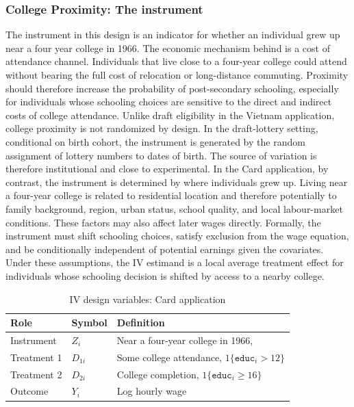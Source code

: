 \documentclass[12pt, a4paper, oneside]{article}
\theoremstyle{plain}
\theoremstyle{definition}
\begin{document}
\subsubsection{College Proximity: The instrument}
The instrument in this design is an indicator for whether an individual grew up near a four year college in 1966. The economic mechanism behind is a cost of attendance channel. Individuals that live close to a four-year college could attend without bearing the full cost of relocation or long-distance commuting. Proximity should therefore increase the probability of post-secondary schooling, especially for individuals whose schooling choices are sensitive to the direct and indirect costs of college attendance.
Unlike draft eligibility in the Vietnam application, college proximity is not randomized by design. In the draft-lottery setting, conditional on birth cohort, the instrument is generated by the random assignment of lottery numbers to dates of birth. The source of variation is therefore institutional and close to experimental. In the Card application, by contrast, the instrument is determined by where individuals grew up. Living near a four-year college is related to residential location and therefore potentially to family background, region, urban status, school quality, and local labour-market conditions. These factors may also affect later wages directly.
Formally, the instrument must shift schooling choices, satisfy exclusion from the wage equation, and be conditionally independent of potential earnings given the covariates. Under these assumptions, the IV estimand is a local average treatment effect for individuals whose schooling decision is shifted by access to a nearby college.


\begin{table}[htbp]
\centering
\caption{IV design variables: Card application}
\label{tab:card_design}
\small
\begin{tabular}{lll}
\toprule
Role & Symbol & Definition \\
\midrule
Instrument & $Z_i$ & Near a four-year college in 1966, \\
Treatment 1 & $D_{1i}$ & Some college attendance, $1\{\texttt{educ}_i>12\}$ \\
Treatment 2 & $D_{2i}$ & College completion, $1\{\texttt{educ}_i\ge16\}$ \\
Outcome & $Y_i$ & Log hourly wage \\
\bottomrule
\end{tabular}
\end{table}
\end{document}
